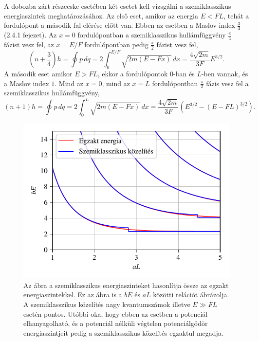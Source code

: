 A dobozba zárt részecske esetében két esetet kell vizsgálni a szemiklasszikus energiaszintek meghatározásához. Az első eset, amikor az energia $E < FL$, tehát a fordulópont a második fal elérése előtt van. Ebben az esetben a Maslov index $\frac{3}{4}$ \cite{brack:semiclassical} (2.4.1 fejezet). Az $x=0$ fordulópontban a szemiklasszikus hullámfüggvény $\frac{\pi}{4}$ fázist vesz fel, az $x=E/F$ fordulópontban pedig $\frac{\pi}{2}$ fázist vesz fel,
\begin{equation}
	\left(n+\frac{3}{4}\right)h=\oint p\,dq=2\int_0^{E/F}\sqrt{2m\left( E-Fx \right)}\,dx=\frac{4\sqrt{2m}}{3F}E^{3/2}.
	\label{semiclassicallevels:e1}
\end{equation}
A második eset amikor $E > FL$, ekkor a fordulópontok $0$-ban és $L$-ben vannak, és a Maslov index $1$. Mind az $x=0$, mind az $x=L$ fordulópontban $\frac{\pi}{2}$ fázis vesz fel a szemiklasszikus hullámfüggvény,
\begin{equation}
	\left(n+1\right)h=\oint p\,dq=2\int_0^{L}\sqrt{2m\left(E-Fx\right)}\,dx=\frac{4\sqrt{2m}}{3F}\left(E^{3/2}-\left(E-FL\right)^{3/2}\right).
	\label{semiclassicallevels:e2}
\end{equation}
\begin{figure}[H]
	\centering
	\includegraphics[scale=1]{./figs/energiaszintkozelites.pdf}
	\caption[Szemiklasszikus energiaszintek]{Az ábra a szemiklasszikus energiaszinteket hasonlítja össze az egzakt energiaszintekkel. Ez az ábra is a $bE$ és $aL$ közötti relációt ábrázolja. A szemiklasszikus közelítés nagy kvantumszámok illetve $E \gg FL$ esetén pontos. Utóbbi oka, hogy ebben az esetben a potenciál elhanyagolható, és a potenciál nélküli végtelen potenciálgödör energiaszintjeit pedig a szemiklasszikus közelítés egzaktul megadja.}
	\label{semiclassicallevels:kozelites}
\end{figure}
